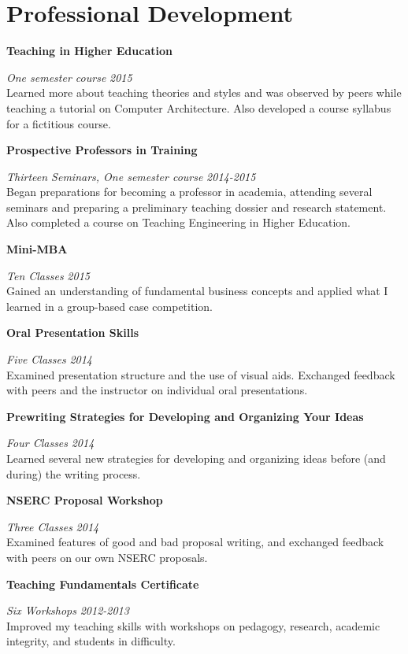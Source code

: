 \section{\sc Professional Development}

{\bf Teaching in Higher Education}
\vspace{-.3cm}

{\em One semester course} \hfill {\em 2015}\\
Learned more about teaching theories and styles and was observed by peers while teaching a tutorial on Computer Architecture.
Also developed a course syllabus for a fictitious course.

{\bf Prospective Professors in Training}
\vspace{-.3cm}

{\em Thirteen Seminars, One semester course} \hfill {\em 2014-2015}\\
Began preparations for becoming a professor in academia, attending several seminars and preparing a preliminary teaching dossier and research statement.
Also completed a course on Teaching Engineering in Higher Education.

{\bf Mini-MBA}
\vspace{-.3cm}

{\em Ten Classes} \hfill {\em 2015}\\
Gained an understanding of fundamental business concepts and applied what I learned in a group-based case competition.

{\bf Oral Presentation Skills}
\vspace{-.3cm}

{\em Five Classes} \hfill {\em 2014}\\
Examined presentation structure and the use of visual aids. Exchanged feedback with peers and the instructor on individual oral presentations.

{\bf Prewriting Strategies for Developing and Organizing Your Ideas}
\vspace{-.3cm}

{\em Four Classes} \hfill {\em 2014}\\
Learned several new strategies for developing and organizing ideas before (and during) the writing process.

{\bf NSERC Proposal Workshop}
\vspace{-.3cm}

{\em Three Classes} \hfill {\em 2014}\\
Examined features of good and bad proposal writing, and exchanged feedback with peers on our own NSERC proposals.

{\bf Teaching Fundamentals Certificate}
\vspace{-.3cm}

{\em Six Workshops} \hfill {\em 2012-2013}\\
Improved my teaching skills with workshops on pedagogy, research, academic integrity, and students in difficulty.
